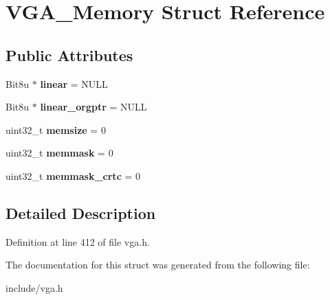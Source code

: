 \hypertarget{structVGA__Memory}{\section{V\-G\-A\-\_\-\-Memory Struct Reference}
\label{structVGA__Memory}
}
\subsection*{Public Attributes}
\begin{DoxyCompactItemize}
\item 
\hypertarget{structVGA__Memory_ad97ba657c0183be121936eeb11436171}{Bit8u $\ast$ {\bfseries linear} = N\-U\-L\-L}\label{structVGA__Memory_ad97ba657c0183be121936eeb11436171}

\item 
\hypertarget{structVGA__Memory_a8b4dbdb74bb5fe961f686c16cae8a11c}{Bit8u $\ast$ {\bfseries linear\-\_\-orgptr} = N\-U\-L\-L}\label{structVGA__Memory_a8b4dbdb74bb5fe961f686c16cae8a11c}

\item 
\hypertarget{structVGA__Memory_aa7ab72d06d3ddb3a945f307865b8d902}{uint32\-\_\-t {\bfseries memsize} = 0}\label{structVGA__Memory_aa7ab72d06d3ddb3a945f307865b8d902}

\item 
\hypertarget{structVGA__Memory_abdbc1c51a3263d179ee67dc7482bf339}{uint32\-\_\-t {\bfseries memmask} = 0}\label{structVGA__Memory_abdbc1c51a3263d179ee67dc7482bf339}

\item 
\hypertarget{structVGA__Memory_ac09f53aaff79d38b002bcf28d04009de}{uint32\-\_\-t {\bfseries memmask\-\_\-crtc} = 0}\label{structVGA__Memory_ac09f53aaff79d38b002bcf28d04009de}

\end{DoxyCompactItemize}


\subsection{Detailed Description}


Definition at line 412 of file vga.\-h.



The documentation for this struct was generated from the following file\-:\begin{DoxyCompactItemize}
\item 
include/vga.\-h\end{DoxyCompactItemize}
